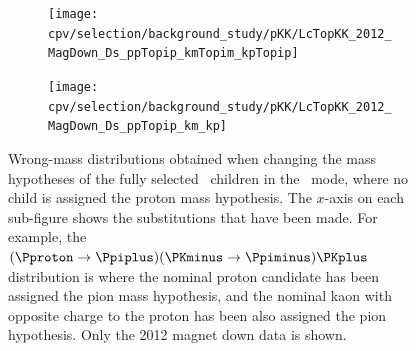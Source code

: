 \begin{figure}
  \begin{subfigure}[b]{0.3\textwidth}
    \texttt{[image: cpv/selection/background\_study/pKK/LcTopKK\_2012\_MagDown\_Ds\_ppTopip\_kmTopim\_kpTopip]}
    \caption{\decay{\PDsplus}{\Ppiplus\Ppiminus\Ppiplus}}
    \label{fig:cpv:selection:background_study:pKK_meson:dsplus_pipipi}
  \end{subfigure}
  \begin{subfigure}[b]{0.3\textwidth}
    \texttt{[image: cpv/selection/background\_study/pKK/LcTopKK\_2012\_MagDown\_Ds\_ppTopip\_km\_kp]}
    \caption{\decay{\PDsplus}{\Ppiplus\PKminus\PKplus}}
    \label{fig:cpv:selection:background_study:pKK_meson:dsplus_piKK}
  \end{subfigure}

  \caption{%
    Wrong-mass distributions obtained when changing the mass hypotheses of the 
    fully selected \PLambdac\ children in the \pKK\ mode, where no child is 
    assigned the proton mass hypothesis.
    The $x$-axis on each sub-figure shows the substitutions that have been 
    made.
    For example, the ${(\Pproton \to \Ppiplus)(\PKminus \to \Ppiminus)\PKplus}$ distribution is 
    where the nominal proton candidate has been assigned the pion mass 
    hypothesis, and the nominal kaon with opposite charge to the proton has 
    been also assigned the pion hypothesis.
    Only the 2012 magnet down data is shown.
  }
  \label{fig:cpv:selection:background_study:pKK_meson}
\end{figure}


